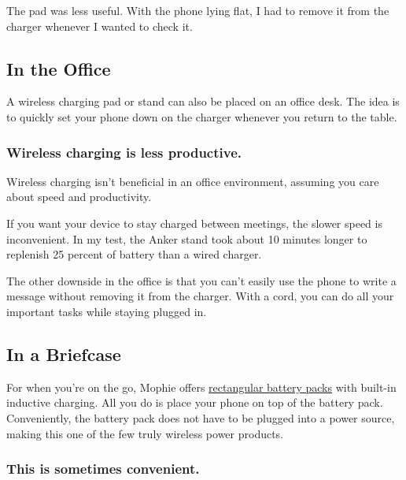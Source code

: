 The pad was less useful. With the phone lying flat, I had to remove it
from the charger whenever I wanted to check it.

\hypertarget{in-the-office}{%
\subsection{In the Office}\label{in-the-office}}

A wireless charging pad or stand can also be placed on an office desk.
The idea is to quickly set your phone down on the charger whenever you
return to the table.

\hypertarget{wireless-charging-is-less-productive}{%
\subsubsection{Wireless charging is less
productive.}\label{wireless-charging-is-less-productive}}

Wireless charging isn't beneficial in an office environment, assuming
you care about speed and productivity.

If you want your device to stay charged between meetings, the slower
speed is inconvenient. In my test, the Anker stand took about 10 minutes
longer to replenish 25 percent of battery than a wired charger.

The other downside in the office is that you can't easily use the phone
to write a message without removing it from the charger. With a cord,
you can do all your important tasks while staying plugged in.

\hypertarget{in-a-briefcase}{%
\subsection{In a Briefcase}\label{in-a-briefcase}}

For when you're on the go, Mophie offers
\href{http://www.mophie.com/shop/wireless/powerstation-wireless-xl}{rectangular
battery packs} with built-in inductive charging. All you do is place
your phone on top of the battery pack. Conveniently, the battery pack
does not have to be plugged into a power source, making this one of the
few truly wireless power products.

\hypertarget{this-is-sometimes-convenient}{%
\subsubsection{\texorpdfstring{\textbf{This is sometimes
convenient.}}{This is sometimes convenient.}}\label{this-is-sometimes-convenient}}

